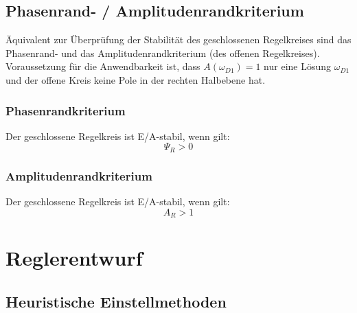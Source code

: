 \documentclass[a4paper,twocolumn,10pt]{article}
\begin{document}
\subsection{Phasenrand- / Amplitudenrandkriterium}
Äquivalent zur Überprüfung der Stabilität des geschlossenen Regelkreises sind das Phasenrand- und das Amplitudenrandkriterium (des offenen Regelkreises). Voraussetzung für die Anwendbarkeit ist, dass $A(\omega_{D1})=1$ nur eine Lösung $\omega_{D1}$ und der offene Kreis keine Pole in der rechten Halbebene hat.
\subsubsection{Phasenrandkriterium}
Der geschlossene Regelkreis ist E/A-stabil, wenn gilt:
\begin{equation*}
\Psi_R>0
\end{equation*}
\subsubsection{Amplitudenrandkriterium}
Der geschlossene Regelkreis ist E/A-stabil, wenn gilt:
\begin{equation*}
A_R>1
\end{equation*}

\section{Reglerentwurf}

\subsection{Heuristische Einstellmethoden}
\end{document}
